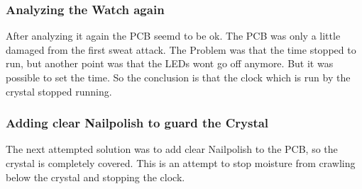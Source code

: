 \documentclass[12pt,a4paper,final]{article}
\begin{document}
\subsubsection*{Analyzing the Watch again}
After analyzing it again the PCB seemd to be ok. The PCB was only a little damaged from the first sweat attack.
The Problem was that the time stopped to run, but another point was that the LEDs wont go off anymore. 
But it was possible to set the time. 
So the conclusion is that the clock which is run by the crystal stopped running.
\subsubsection{Adding clear Nailpolish to guard the Crystal}
The next attempted solution was to add clear Nailpolish to the PCB, so the crystal is completely covered. This is an attempt to stop moisture from crawling below the crystal and stopping the clock.
\end{document}
